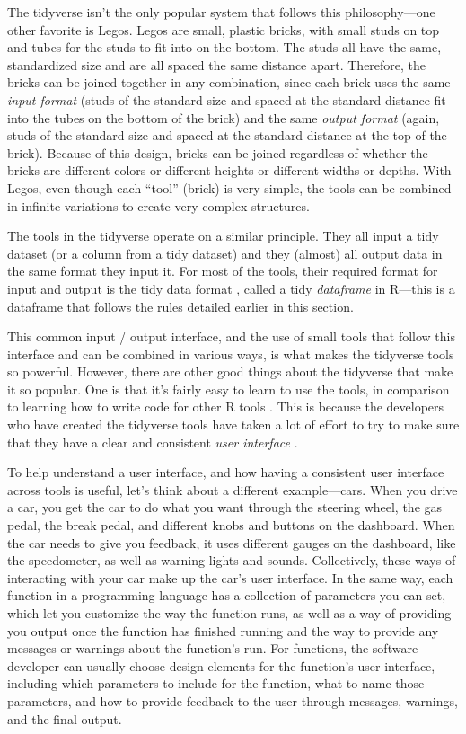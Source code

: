 \documentclass[]{tufte-book}
\begin{document}
The tidyverse isn't the only popular system that follows this
philosophy---one other favorite is Legos. Legos are small, plastic bricks, with
small studs on top and tubes for the studs to fit into on the bottom. The studs
all have the same, standardized size and are all spaced the same distance apart.
Therefore, the bricks can be joined together in any combination, since each
brick uses the same \emph{input format} (studs of the standard size and spaced at the
standard distance fit into the tubes on the bottom of the brick) and the same
\emph{output format} (again, studs of the standard size and spaced at the standard
distance at the top of the brick). Because of this design, bricks can be joined
regardless of whether the bricks are different colors or different heights or
different widths or depths. With Legos, even though each ``tool'' (brick) is very
simple, the tools can be combined in infinite variations to create very complex
structures.

The tools in the tidyverse operate on a similar principle. They all input a
tidy dataset (or a column from a tidy dataset) and they (almost) all output data
in the same format they input it. For most of the tools, their required format
for input and output is the tidy data format \citep{wickham2014tidy}, called a tidy
\emph{dataframe} in R---this is a dataframe that follows the rules detailed earlier
in this section.

This common input / output interface, and the use of small tools that follow
this interface and can be combined in various ways, is what makes the tidyverse
tools so powerful. However, there are other good things about the tidyverse that
make it so popular. One is that it's fairly easy to learn to use the tools, in
comparison to learning how to write code for other R tools \citep{robinson2017teach, peng2018teaching}. This is because the developers who have created the
tidyverse tools have taken a lot of effort to try to make sure that they have a
clear and consistent \emph{user interface} \citep{wickham2017tidy, bryan2017data}.

To help understand a user interface, and how having a consistent user interface
across tools is useful, let's think about a different example---cars. When you
drive a car, you get the car to do what you want through the steering wheel, the
gas pedal, the break pedal, and different knobs and buttons on the dashboard.
When the car needs to give you feedback, it uses different gauges on the
dashboard, like the speedometer, as well as warning lights and sounds.
Collectively, these ways of interacting with your car make up the car's user
interface. In the same way, each function in a programming language has a
collection of parameters you can set, which let you customize the way the
function runs, as well as a way of providing you output once the function has
finished running and the way to provide any messages or warnings about the
function's run. For functions, the software developer can usually choose design
elements for the function's user interface, including which parameters to
include for the function, what to name those parameters, and how to provide
feedback to the user through messages, warnings, and the final output.
\end{document}
